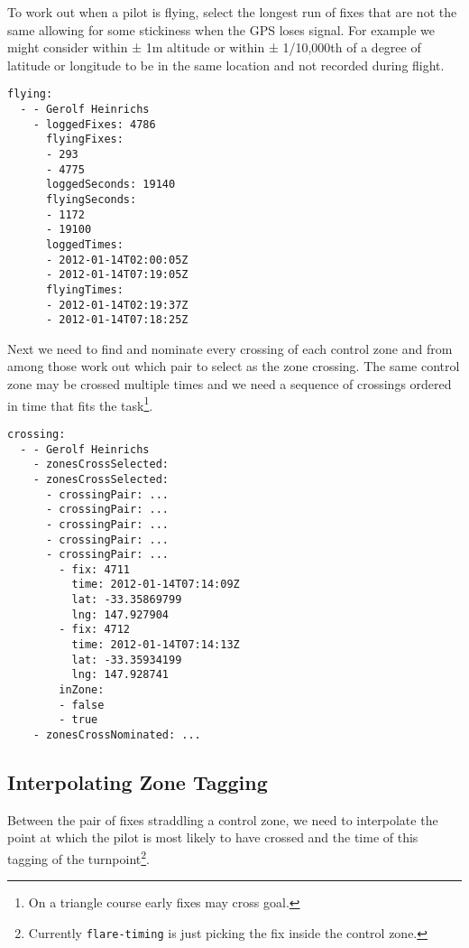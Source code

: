 \documentclass[gap.tex]{subfiles}
\begin{document}
To work out when a pilot is flying, select the longest run of fixes that are
not the same allowing for some stickiness when the GPS loses signal. For
example we might consider within ± 1m altitude or within ± 1/10,000th of
a degree of latitude or longitude to be in the same location and not recorded
during flight.

\begin{lstlisting}[caption={Which fixes are considered flown, \texttt{flying} nodes of \texttt{*.cross-zone.yaml}.}]
flying:
  - - Gerolf Heinrichs
    - loggedFixes: 4786
      flyingFixes:
      - 293
      - 4775
      loggedSeconds: 19140
      flyingSeconds:
      - 1172
      - 19100
      loggedTimes:
      - 2012-01-14T02:00:05Z
      - 2012-01-14T07:19:05Z
      flyingTimes:
      - 2012-01-14T02:19:37Z
      - 2012-01-14T07:18:25Z
\end{lstlisting}

Next we need to find and nominate every crossing of each control zone and from
among those work out which pair to select as the zone crossing. The same
control zone may be crossed multiple times and we need a sequence of crossings
ordered in time that fits the task\footnote{On a triangle course early fixes
may cross goal.}.

\begin{lstlisting}[caption={Selected crossings, one for each zone, \texttt{crossing} nodes of \texttt{*.cross-zone.yaml}.}]
crossing:
  - - Gerolf Heinrichs
    - zonesCrossSelected:
    - zonesCrossSelected:
      - crossingPair: ...
      - crossingPair: ...
      - crossingPair: ...
      - crossingPair: ...
      - crossingPair: ...
        - fix: 4711
          time: 2012-01-14T07:14:09Z
          lat: -33.35869799
          lng: 147.927904
        - fix: 4712
          time: 2012-01-14T07:14:13Z
          lat: -33.35934199
          lng: 147.928741
        inZone:
        - false
        - true
    - zonesCrossNominated: ...
\end{lstlisting}

\newpage
\subsection{Interpolating Zone Tagging}

Between the pair of fixes straddling a control zone, we need to interpolate the
point at which the pilot is most likely to have crossed and the time of this
tagging of the turnpoint\footnote{Currently \texttt{flare-timing} is just picking the fix inside the control zone.}.
\end{document}
